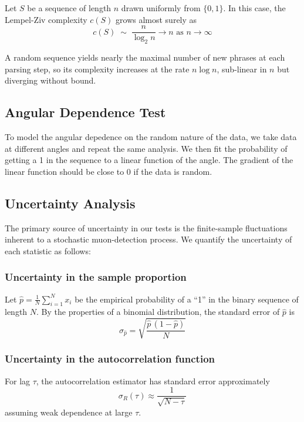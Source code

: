 Let $S$ be a sequence of length $n$ drawn uniformly from $\{0,1\}$.  In this case, the Lempel-Ziv complexity $c(S)$ grows almost surely as
\begin{equation}
    c(S)\;\sim\;\frac{n}{\log_{2}n}\to n \text{ as } n\to\infty
\end{equation}

A random sequence yields nearly the maximal number of new phrases at each parsing step, so its complexity increases at the rate $n \log{n}$, sub-linear in $n$ but diverging without bound. 

\subsection{Angular Dependence Test}
To model the angular depedence on the random nature of the data, we take data at different angles and repeat the same analysis. We then fit the probability of getting a 1 in the sequence to a linear function of the angle. The gradient of the linear function should be close to 0 if the data is random.

\subsection{Uncertainty Analysis}
The primary source of uncertainty in our tests is the finite-sample fluctuations inherent to a stochastic muon-detection process.  We quantify the uncertainty of each statistic as follows:

\subsubsection{Uncertainty in the sample proportion}
Let $\hat p = \tfrac{1}{N}\sum_{i=1}^N x_i$ be the empirical probability of a “1” in the binary sequence of length $N$.  By the properties of a binomial distribution, the standard error of $\hat{p}$ is
\begin{equation}
\sigma_{\hat p}
= \sqrt{\frac{\hat p\,(1-\hat p)}{N}}
\end{equation}


\subsubsection{Uncertainty in the autocorrelation function}
For lag \(\tau\), the autocorrelation estimator has standard error approximately
\begin{equation}
\sigma_{R}(\tau) \approx \frac{1}{\sqrt{N-\tau}}
\end{equation}
assuming weak dependence at large $\tau$.

